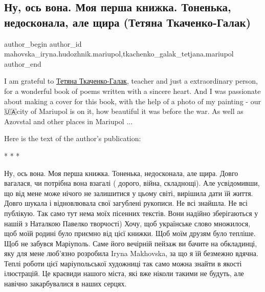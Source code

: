  
 
 
 
 

\subsection{Ну, ось вона. Моя перша книжка. Тоненька, недосконала, але щира (Тетяна Ткаченко-Галак)}
\label{sec:31_03_2023.fb.mahovska_iryna.hudozhnik.mariupol.1.tetjana_tkachenko_galak_knizhka}
 
\ifcmt
 author_begin
   author_id mahovska_iryna.hudozhnik.mariupol,tkachenko_galak_tetjana.mariupol
 author_end
\fi

I am grateful to
\href{https://www.facebook.com/profile.php?id=100034532776327}{Тетяна Ткаченко-Галак}, 
teacher and just a extraordinary person, for a wonderful book
of poems written with a sincere heart. And I was passionate about making a
cover for this book, with the help of a photo of my painting - our 🇺🇦city of
Mariupol is on it, how beautiful it was before the war. As well as Azovstal and
other places in Mariupol ...

Here is  the text of the author's publication:

* * *

Ну, ось вона. Моя перша книжка. Тоненька, недосконала, але щира. Довго
вагалася, чи потрібна вона взагалі ( дорого, війна, складнощі). Але
усвідомивши, що від мене може нічого не залишитися у цьому світі, вирішила дати
їй життя. Довго шукала і відновлювала свої загублені рукописи. Не всі знайшла.
Не всі публікую. Так само тут нема моїх пісенних текстів. Вони надійно
зберігаються у нашій з  Наталкою Павелко творчості) Хочу, щоб українське слово
множилося, щоб моїй родині було приємно від цієї книжки. Щоб моїм друзям було
тепліше. Щоб не забувся Маріуполь. Саме його вечірній пейзаж ви бачите на
обкладинці, яку для мене люб'язно розробила Iryna Makhovska, за що я їй
безмежно вдячна. Теплі роботи цієї маріупольської художниці так само можна
знайти в якості ілюстрацій. Це краєвиди нашого міста, які вже ніколи такими не
будуть, але навічно закарбувалися в наших серцях. 

